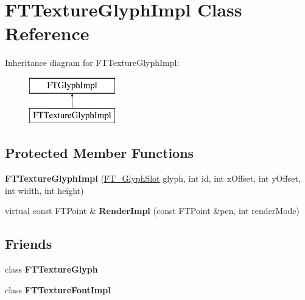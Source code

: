 \hypertarget{class_f_t_texture_glyph_impl}{\section{F\-T\-Texture\-Glyph\-Impl Class Reference}
\label{class_f_t_texture_glyph_impl}
}
Inheritance diagram for F\-T\-Texture\-Glyph\-Impl\-:\begin{figure}[H]
\begin{center}
\leavevmode
\includegraphics[height=2.000000cm]{class_f_t_texture_glyph_impl}
\end{center}
\end{figure}
\subsection*{Protected Member Functions}
\begin{DoxyCompactItemize}
\item 
\hypertarget{class_f_t_texture_glyph_impl_a63893590c3c3c45da5f3925ae9a97abd}{{\bfseries F\-T\-Texture\-Glyph\-Impl} (\hyperlink{struct_f_t___glyph_slot_rec__}{F\-T\-\_\-\-Glyph\-Slot} glyph, int id, int x\-Offset, int y\-Offset, int width, int height)}\label{class_f_t_texture_glyph_impl_a63893590c3c3c45da5f3925ae9a97abd}

\item 
\hypertarget{class_f_t_texture_glyph_impl_a3fce2bf9435946ae0f8ee5eacbe7f702}{virtual const F\-T\-Point \& {\bfseries Render\-Impl} (const F\-T\-Point \&pen, int render\-Mode)}\label{class_f_t_texture_glyph_impl_a3fce2bf9435946ae0f8ee5eacbe7f702}

\end{DoxyCompactItemize}
\subsection*{Friends}
\begin{DoxyCompactItemize}
\item 
\hypertarget{class_f_t_texture_glyph_impl_a01c2ee1e01ccd33e4f1f26f2478a74a0}{class {\bfseries F\-T\-Texture\-Glyph}}\label{class_f_t_texture_glyph_impl_a01c2ee1e01ccd33e4f1f26f2478a74a0}

\item 
\hypertarget{class_f_t_texture_glyph_impl_a566181ddfc0f1c50d2ff9fd4160a0ff5}{class {\bfseries F\-T\-Texture\-Font\-Impl}}\label{class_f_t_texture_glyph_impl_a566181ddfc0f1c50d2ff9fd4160a0ff5}

\end{DoxyCompactItemize}
